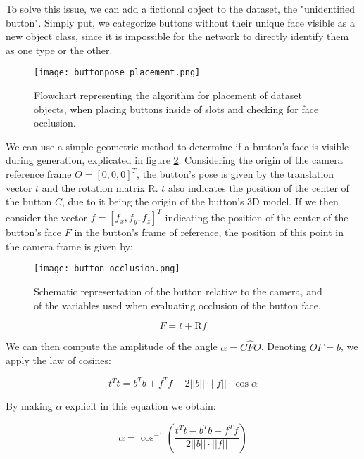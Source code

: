 To solve this issue, we can add a fictional object to the dataset, the "unidentified button". Simply put, we categorize buttons without their unique face visible as a new object class, since it is impossible for the network to directly identify them as one type or the other.

\begin{figure}[ht]
    \texttt{[image: buttonpose\_placement.png]}
    \caption{Flowchart representing the algorithm for placement of dataset objects, when placing buttons inside of slots and checking for face occlusion.}
    \label{fig:buttonpose_placement}
\end{figure}

We can use a simple geometric method to determine if a button's face is visible during generation, explicated in figure \ref{fig:button_occlusion}. Considering the origin of the camera reference frame $O = [0, 0, 0]^T$, the button's pose is given by the translation vector $t$ and the rotation matrix R. $t$ also indicates the position of the center of the button $C$, due to it being the origin of the button's 3D model. If we then consider the vector $f = [f_x, f_y, f_z]^T$ indicating the position of the center of the button's face $F$ in the button's frame of reference, the position of this point in the camera frame is given by:

\begin{figure}
    \texttt{[image: button\_occlusion.png]}
    \caption{Schematic representation of the button relative to the camera, and of the variables used when evaluating occlusion of the button face.}
    \label{fig:button_occlusion}
\end{figure}

\begin{equation*}
    F = t + \text{R}f
\end{equation*}

We can then compute the amplitude of the angle $\alpha = C\hat{F}O$. Denoting $OF=b$, we apply the law of cosines:

\begin{equation*}
    t^Tt = b^Tb + f^Tf -  2||b||\cdot ||f|| \cdot \cos \alpha
\end{equation*}

By making $\alpha$ explicit in this equation we obtain:

\begin{equation*}
    \alpha = \cos^{-1}\left(\frac{t^Tt- b^Tb-f^Tf}{2||b||\cdot||f||}\right)
\end{equation*}

